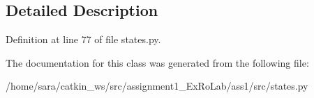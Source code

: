 \subsection{Detailed Description}


Definition at line 77 of file states.\+py.



The documentation for this class was generated from the following file\+:\begin{DoxyCompactItemize}
\item 
/home/sara/catkin\+\_\+ws/src/assignment1\+\_\+\+Ex\+Ro\+Lab/ass1/src/states.\+py\end{DoxyCompactItemize}
